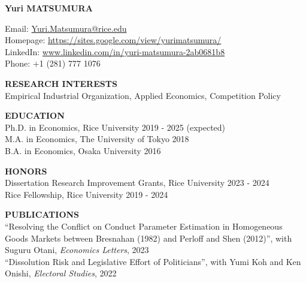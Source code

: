 \documentclass[10pt]{article}
\begin{document}
\begin{center}
    {\LARGE \textbf{Yuri MATSUMURA}} \\
\end{center}

\vspace{1mm}
Email: \href{mailto:Yuri.Matsumura@rice.edu}{Yuri.Matsumura@rice.edu} \\
Homepage: \href{https://sites.google.com/view/yurimatsumura/}{https://sites.google.com/view/yurimatsumura/} \\
LinkedIn: \href{https://www.linkedin.com/in/yuri-matsumura-2ab0681b8}{www.linkedin.com/in/yuri-matsumura-2ab0681b8} \\
Phone: +1 (281) 777 1076

\vspace{10pt}

\textbf{RESEARCH INTERESTS} \\
Empirical Industrial Organization, Applied Economics, Competition Policy

\vspace{10pt}

\textbf{EDUCATION} \\
Ph.D. in Economics, Rice University \hfill 2019 - 2025 (expected) \\
M.A. in Economics, The University of Tokyo \hfill 2018 \\
B.A. in Economics, Osaka University \hfill 2016

\vspace{10pt}

\textbf{HONORS} \\
Dissertation Research Improvement Grants, Rice University \hfill 2023 - 2024 \\
Rice Fellowship, Rice University \hfill 2019 - 2024

\vspace{10pt}

\textbf{PUBLICATIONS} \\
“Resolving the Conflict on Conduct Parameter Estimation in Homogeneous Goods Markets between Bresnahan (1982) and Perloff and Shen (2012)”, with Suguru Otani, \textit{Economics Letters}, 2023 \\
“Dissolution Risk and Legislative Effort of Politicians”, with Yumi Koh and Ken Onishi, \textit{Electoral Studies}, 2022

\vspace{10pt}
\end{document}
